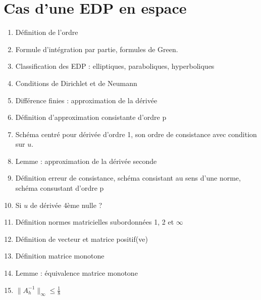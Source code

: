 \documentclass[11pt, twocolumn, landscape]{article}
\begin{document}
\section{Cas d'une EDP en espace}
\begin{enumerate}
\item Définition de l'ordre
\item Formule d'intégration par partie, formules de Green.
\item Classification des EDP : elliptiques, paraboliques, hyperboliques
\item Conditions de Dirichlet et de Neumann
\item Différence finies : approximation de la dérivée
\item Définition d'approximation consistante d'ordre p
\item Schéma centré pour dérivée d'ordre 1, son ordre de consistance avec condition sur $u$.
\item Lemme : approximation de la dérivée seconde
\item Définition erreur de consistance, schéma consistant au sens d'une norme, schéma consustant d'ordre p
\item Si $u$ de dérivée 4ème nulle ?
\item Définition normes matricielles subordonnées 1, 2 et $\infty$
\item Définition de vecteur et matrice positif(ve)
\item Définition matrice monotone
\item Lemme : équivalence matrice monotone
\item \bf{$\|A_h^{-1}\|_{\infty}\leq \frac{1}{8}$}
\end{enumerate}
\end{document}
